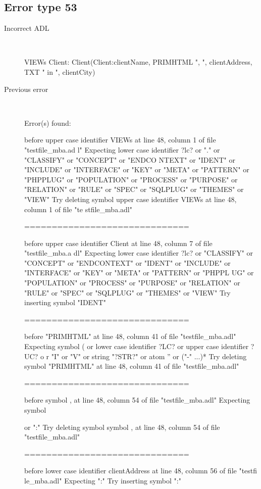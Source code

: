 \subsection{Error type 53}
  \begin{description}
  \item[Incorrect ADL]~\\
\begin{adl}
VIEWs Client: Client(Client:clientName, PRIMHTML ", ", clientAddress, TXT " in ", clientCity)\end{adl}
  \item[Previous error]~\\
\begin{haskell}
Error(s) found:

before upper case identifier VIEWs at line 48, column 1 of file "testfile_mba.ad
l"
Expecting lower case identifier ?lc? or "." or "CLASSIFY" or "CONCEPT" or "ENDCO
NTEXT" or "IDENT" or "INCLUDE" or "INTERFACE" or "KEY" or "META" or "PATTERN" or
 "PHPPLUG" or "POPULATION" or "PROCESS" or "PURPOSE" or "RELATION" or "RULE" or
"SPEC" or "SQLPLUG" or "THEMES" or "VIEW"
Try deleting symbol upper case identifier VIEWs at line 48, column 1 of file "te
stfile_mba.adl"

==============================

before upper case identifier Client at line 48, column 7 of file "testfile_mba.a
dl"
Expecting lower case identifier ?lc? or "CLASSIFY" or "CONCEPT" or "ENDCONTEXT"
or "IDENT" or "INCLUDE" or "INTERFACE" or "KEY" or "META" or "PATTERN" or "PHPPL
UG" or "POPULATION" or "PROCESS" or "PURPOSE" or "RELATION" or "RULE" or "SPEC"
or "SQLPLUG" or "THEMES" or "VIEW"
Try inserting symbol "IDENT"

==============================

before "PRIMHTML" at line 48, column 41 of file "testfile_mba.adl"
Expecting symbol ( or lower case identifier ?LC? or upper case identifier ?UC? o
r "I" or "V" or string "?STR?" or atom '' or ("-" ...)*
Try deleting symbol "PRIMHTML" at line 48, column 41 of file "testfile_mba.adl"

==============================

before symbol , at line 48, column 54 of file "testfile_mba.adl"
Expecting symbol { or ":"
Try deleting symbol symbol , at line 48, column 54 of file "testfile_mba.adl"

==============================

before lower case identifier clientAddress at line 48, column 56 of file "testfi
le_mba.adl"
Expecting ":"
Try inserting symbol ":"

}
\end{haskell}
\end{description}
